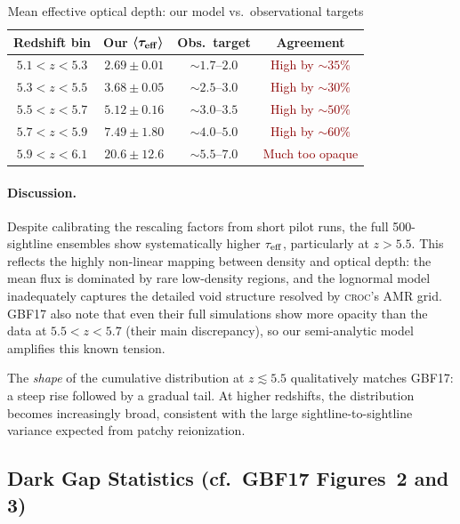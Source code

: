 \documentclass[11pt]{article}
\newcommand{\taueff}{\tau_{\rm eff}}
\newcommand{\croc}{\textsc{croc}}
\begin{document}
\begin{table}[H]
\centering
\caption{Mean effective optical depth: our model vs.\ observational targets}
\label{tab:taueff}
\begin{tabular}{@{}cccc@{}}
\toprule
\textbf{Redshift bin} & \textbf{Our} $\boldsymbol{\langle\taueff\rangle}$ & \textbf{Obs.\ target} & \textbf{Agreement} \\
\midrule
$5.1 < z < 5.3$ & $2.69 \pm 0.01$ & $\sim 1.7$--$2.0$ & \textcolor{darkred}{High by $\sim35\%$} \\
$5.3 < z < 5.5$ & $3.68 \pm 0.05$ & $\sim 2.5$--$3.0$ & \textcolor{darkred}{High by $\sim30\%$} \\
$5.5 < z < 5.7$ & $5.12 \pm 0.16$ & $\sim 3.0$--$3.5$ & \textcolor{darkred}{High by $\sim50\%$} \\
$5.7 < z < 5.9$ & $7.49 \pm 1.80$ & $\sim 4.0$--$5.0$ & \textcolor{darkred}{High by $\sim60\%$} \\
$5.9 < z < 6.1$ & $20.6 \pm 12.6$ & $\sim 5.5$--$7.0$ & \textcolor{darkred}{Much too opaque} \\
\bottomrule
\end{tabular}
\end{table}

\paragraph{Discussion.} Despite calibrating the rescaling factors from short pilot runs, the full 500-sightline ensembles show systematically higher $\taueff$, particularly at $z > 5.5$. This reflects the highly non-linear mapping between density and optical depth: the mean flux is dominated by rare low-density regions, and the lognormal model inadequately captures the detailed void structure resolved by \croc{}'s AMR grid. GBF17 also note that even their full simulations show more opacity than the data at $5.5 < z < 5.7$ (their main discrepancy), so our semi-analytic model amplifies this known tension.

The \emph{shape} of the cumulative distribution at $z \lesssim 5.5$ qualitatively matches GBF17: a steep rise followed by a gradual tail. At higher redshifts, the distribution becomes increasingly broad, consistent with the large sightline-to-sightline variance expected from patchy reionization.

\subsection{Dark Gap Statistics (cf.\ GBF17 Figures~2 and 3)}
\end{document}
